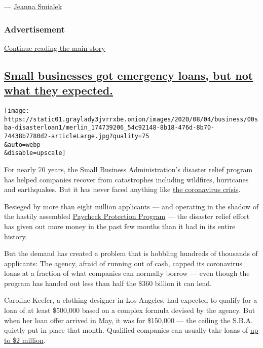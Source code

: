 --- \href{https://www.nytimes3xbfgragh.onion/by/jeanna-smialek}{Jeanna
Smialek}

\hypertarget{advertisement}{%
\subsubsection{Advertisement}\label{advertisement}}

\protect\hyperlink{after-dfp-ad-mid1}{Continue reading the main story}

\hypertarget{small-businesses-got-emergency-loans-but-not-what-they-expected}{%
\subsection{\texorpdfstring{\protect\hyperlink{small-businesses-got-emergency-loans-but-not-what-they-expected}{Small
businesses got emergency loans, but not what they
expected.}}{Small businesses got emergency loans, but not what they expected.}}\label{small-businesses-got-emergency-loans-but-not-what-they-expected}}

\texttt{[image: https://static01.graylady3jvrrxbe.onion/images/2020/08/04/business/00sba-disasterloan1/merlin\_174739206\_54c92148-8b18-476d-8b70-74438b7780d2-articleLarge.jpg?quality=75\\\&auto=webp\\\&disable=upscale]}

For nearly 70 years, the Small Business Administration's disaster relief
program has helped companies recover from catastrophes including
wildfires, hurricanes and earthquakes. But it has never faced anything
like
\href{https://www.nytimes3xbfgragh.onion/news-event/coronavirus}{the
coronavirus crisis}.

Besieged by more than eight million applicants --- and operating in the
shadow of the hastily assembled
\href{https://www.nytimes3xbfgragh.onion/2020/04/26/business/ppp-small-business-loans.html}{Paycheck
Protection Program} --- the disaster relief effort has given out more
money in the past few months than it had in its entire history.

But the demand has created a problem that is hobbling hundreds of
thousands of applicants: The agency, afraid of running out of cash,
capped its coronavirus loans at a fraction of what companies can
normally borrow --- even though the program has handed out less than
half the \$360 billion it can lend.

Caroline Keefer, a clothing designer in Los Angeles, had expected to
qualify for a loan of at least \$500,000 based on a complex formula
devised by the agency. But when her loan offer arrived in May, it was
for \$150,000 --- the ceiling the S.B.A. quietly put in place that
month. Qualified companies can usually take loans of
\href{https://www.sba.gov/about-sba/sba-newsroom/press-releases-media-advisories/sba-provide-disaster-assistance-loans-small-businesses-impacted-coronavirus-covid-19}{up
to \$2 million}.

